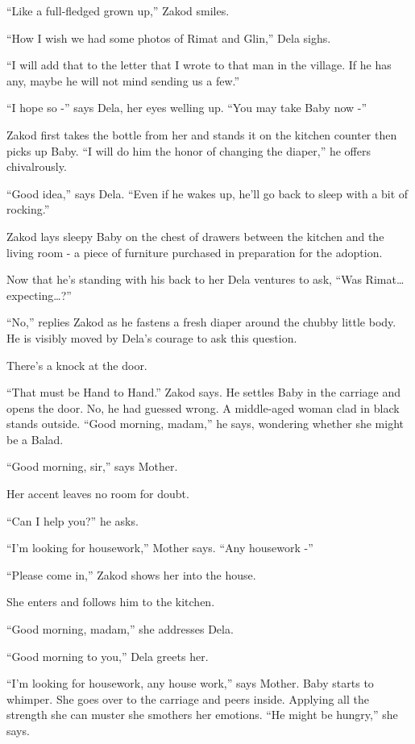 \documentclass[twoside,11pt]{book}
\begin{document}
``Like a full-fledged grown up,'' Zakod smiles.

``How I wish we had some photos of Rimat and Glin,'' Dela sighs.

``I will add that to the letter that I wrote to that man in the village. If he has any, maybe he will not
mind sending us a few.''

``I hope so -'' says Dela, her eyes welling up.  ``You may take Baby now
-''

Zakod first takes the bottle from her and stands it on the kitchen counter then picks up Baby. ``I will do
him the honor of changing the diaper,'' he offers chivalrously.

``Good idea,'' says Dela. ``Even if he wakes up, he'll go back to sleep with a
bit of rocking.''

Zakod lays sleepy Baby on the chest of drawers between the kitchen and the living room - a piece of furniture purchased
in preparation for the adoption.

Now that he's standing with his back to her Dela ventures to ask, ``Was Rimat{\dots}
expecting{\dots}?''

``No,'' replies Zakod as he fastens a fresh diaper around the chubby little body.  He is
visibly moved by Dela's courage to ask this question.

There's a knock at the door.

{}``That must be Hand to Hand.'' Zakod says. He settles Baby in the carriage and opens the door. No, he had
guessed wrong. A middle-aged{ }woman clad in black stands outside. ``Good morning,
madam,'' he says, wondering whether she might be a Balad.

``Good morning, sir,'' says Mother.

Her accent leaves no room for doubt.

``Can I help you?'' he asks.

``I'm looking for housework,'' Mother says. ``Any housework -''

``Please come in,'' Zakod shows her into the house.

She enters and follows him to the kitchen.

``Good morning, madam,'' she addresses Dela.

``Good morning to you,'' Dela greets her.

``I'm looking for housework, any house work,'' says Mother. Baby starts to whimper. She goes
over to the carriage and peers inside. Applying all the strength she can muster she smothers her emotions.
``He might be hungry,'' she says.
\end{document}
